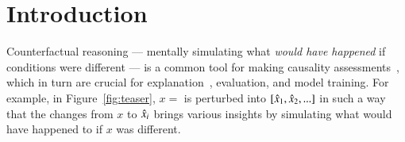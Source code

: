 \section{Introduction}
\label{sec:intro}

Counterfactual reasoning --- mentally simulating what \emph{would have happened} if conditions were different --- is a common tool for making causality assessments~\cite{kahneman}, which in turn are crucial for explanation~\cite{miller}, evaluation, and model training. For example, in Figure~\ref{fig:teaser}, $x=$  is perturbed into $[\hat{x}_1, \hat{x}_2, ...]$ in such a way that the changes from $x$ to $\hat{x}_i$ brings various insights by simulating what would have happened to if $x$ was different.

